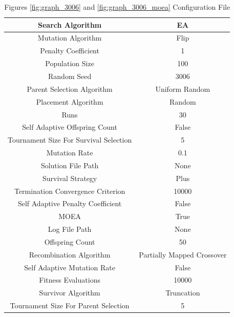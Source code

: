 \documentclass{standalone}
\begin{document}
\clearpage
\begin{table}[!htb]
	\centering
	\caption{Figures \ref{fig:graph_3006} and \ref{fig:graph_3006_moea} Configuration File}
	\label{tab:graph_3006}
	\begin{tabular}{| c | c |}
		\hline
		Search Algorithm		& EA		 \\
		\hline
		Mutation Algorithm		& Flip		 \\
		\hline
		Penalty Coefficient		& 1		 \\
		\hline
		Population Size		& 100		 \\
		\hline
		Random Seed		& 3006		 \\
		\hline
		Parent Selection Algorithm		& Uniform Random		 \\
		\hline
		Placement Algorithm		& Random		 \\
		\hline
		Runs		& 30		 \\
		\hline
		Self Adaptive Offspring Count		& False		 \\
		\hline
		Tournament Size For Survival Selection		& 5		 \\
		\hline
		Mutation Rate		& 0.1		 \\
		\hline
		Solution File Path		& None		 \\
		\hline
		Survival Strategy		& Plus		 \\
		\hline
		Termination Convergence Criterion		& 10000		 \\
		\hline
		Self Adaptive Penalty Coefficient		& False		 \\
		\hline
		MOEA		& True		 \\
		\hline
		Log File Path		& None		 \\
		\hline
		Offspring Count		& 50		 \\
		\hline
		Recombination Algorithm		& Partially Mapped Crossover		 \\
		\hline
		Self Adaptive Mutation Rate		& False		 \\
		\hline
		Fitness Evaluations		& 10000		 \\
		\hline
		Survivor Algorithm		& Truncation		 \\
		\hline
		Tournament Size For Parent Selection		& 5		 \\
		\hline
	\end{tabular}
\end{table}
\end{document}
